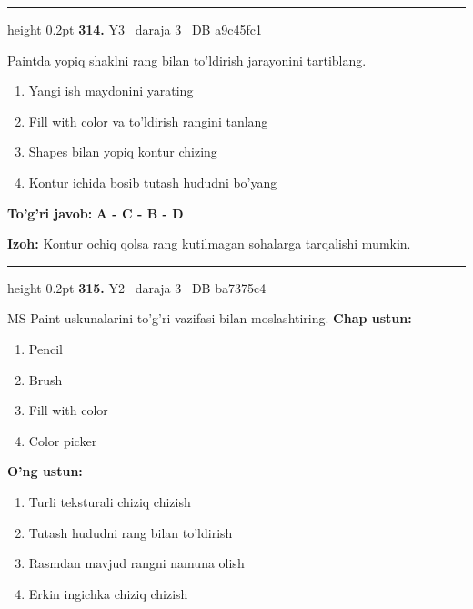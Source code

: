 \documentclass[10pt,a4paper,oneside]{article}
\begin{document}
\vspace{2mm}\hrule height 0.2pt \vspace{4mm}
\hypertarget{q314}{\textbf{\color{ink}314.}}  {\color{muted}\scriptsize Y3 \textbullet\ daraja 3 \textbullet\ DB a9c45fc1}
\par
Paintda yopiq shaklni rang bilan to'ldirish jarayonini tartiblang.
\begin{enumerate}[label=\Alph*),leftmargin=9mm]
\item Yangi ish maydonini yarating
\item Fill with color va to'ldirish rangini tanlang
\item Shapes bilan yopiq kontur chizing
\item Kontur ichida bosib tutash hududni bo'yang
\end{enumerate}
\begin{tcolorbox}[enhanced,breakable,colback=teal!4,colframe=teal!45!black,boxrule=0.45pt,arc=1.2mm,left=2.8mm,right=2.8mm,top=2mm,bottom=2mm,before skip=2mm,after skip=2mm]
\textbf{\color{teal}To'g'ri javob:} \textbf{A - C - B - D}
\par\smallskip
\textbf{Izoh:} Kontur ochiq qolsa rang kutilmagan sohalarga tarqalishi mumkin.
\end{tcolorbox}
\vspace{2mm}\hrule height 0.2pt \vspace{4mm}
\hypertarget{q315}{\textbf{\color{ink}315.}}  {\color{muted}\scriptsize Y2 \textbullet\ daraja 3 \textbullet\ DB ba7375c4}
\par
MS Paint uskunalarini to'g'ri vazifasi bilan moslashtiring.
\textbf{\footnotesize Chap ustun:}
\begin{enumerate}[label=\arabic*),leftmargin=9mm]
\item Pencil
\item Brush
\item Fill with color
\item Color picker
\end{enumerate}
\textbf{\footnotesize O'ng ustun:}
\begin{enumerate}[label=\Alph*),leftmargin=9mm]
\item Turli teksturali chiziq chizish
\item Tutash hududni rang bilan to'ldirish
\item Rasmdan mavjud rangni namuna olish
\item Erkin ingichka chiziq chizish
\end{enumerate}
\end{document}
